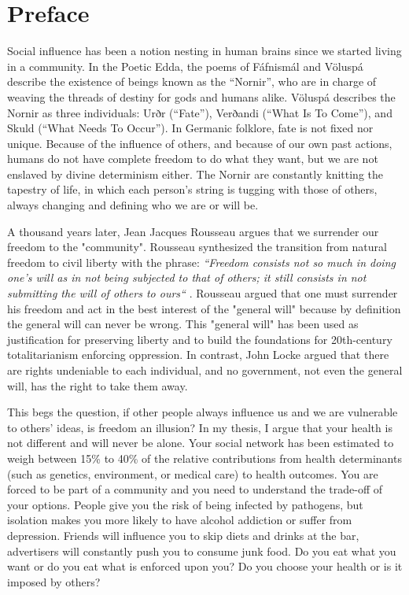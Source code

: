 \documentclass[12pt,twoside,a4paper,fleqn, english]{report}
\begin{document}
\chapter*{Preface}

        Social influence has been a notion nesting in human brains since we started living in a community. In the Poetic Edda, the poems of Fáfnismál \cite{ref:SagaBook}\cite{ref:Saga1} and Völuspá \cite{ref:Saga2} describe the existence of beings known as the “Nornir”, who are in charge of weaving the threads of destiny for gods and humans alike. Völuspá describes the Nornir as three individuals: Urðr (“Fate”), Verðandi (“What Is To Come”), and Skuld (“What Needs To Occur”). In Germanic folklore, fate is not fixed nor unique. Because of the influence of others, and because of our own past actions, humans do not have complete freedom to do what they want, but we are not enslaved by divine determinism either. The Nornir are constantly knitting the tapestry of life, in which each person's string is tugging with those of others, always changing and defining who we are or will be.

        A thousand years later, Jean Jacques Rousseau argues that we surrender our freedom to the "community". Rousseau synthesized the transition from natural freedom to civil liberty with the phrase: \textit{“Freedom consists not so much in doing one’s will as in not being subjected to that of others; it still consists in not submitting the will of others to ours“} \cite{ref:RousseauBook}. Rousseau argued that one must surrender his freedom and act in the best interest of the "general will" because by definition the general will can never be wrong. This "general will" has been used as justification for preserving liberty and to build the foundations for 20th-century totalitarianism enforcing oppression. In contrast, John Locke argued that there are rights undeniable to each individual, and no government, not even the general will, has the right to take them away.

        This begs the question, if other people always influence us and we are vulnerable to others' ideas, is freedom an illusion? In my thesis, I argue that your health is not different and will never be alone. Your social network has been estimated to weigh between 15\% to 40\% \cite{ref:socialinfluence2014} of the relative contributions from health determinants (such as genetics, environment, or medical care) to health outcomes. You are forced to be part of a community and you need to understand the trade-off of your options. People give you the risk of being infected by pathogens, but isolation makes you more likely to have alcohol addiction or suffer from depression. Friends will influence you to skip diets and drinks at the bar, advertisers will constantly push you to consume junk food. Do you eat what you want or do you eat what is enforced upon you? Do you choose your health or is it imposed by others?
\end{document}
